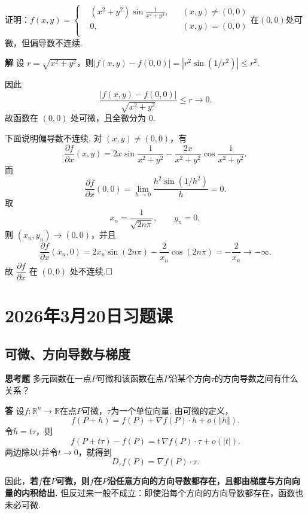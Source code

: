 \documentclass{ctexart}
\newcounter{EnvironmentCounter}
\newcommand{\renewEnvironmentCounter}{\setcounter{EnvironmentCounter}{0}}
\newenvironment{custom}[1]{\par\noindent \textbf{#1}\quad}{\par\vspace{1em}}
\begin{document}
\begin{example}
证明：$f(x,y)=\left\{\begin{aligned}&(x^{2}+y^{2})\sin{\frac{1}{x^{2}+y^{2}}},&& (x,y)\neq (0,0)\\&0, &&(x,y)=(0,0)\\\end{aligned}\right.$在$(0,0)$处可微，但偏导数不连续.
\end{example}

\begin{custom}{解}
设 $r=\sqrt{x^2+y^2}$，则$|f(x,y)-f(0,0)|=|r^2\sin(1/r^2)|\leqslant r^2.$

因此
$$\frac{|f(x,y)-f(0,0)|}{\sqrt{x^2+y^2}}
\leqslant r\to 0.$$
故函数在 $(0,0)$ 处可微，且全微分为 $0$.

下面说明偏导数不连续. 对 $(x,y)\neq (0,0)$，有
$$\frac{\partial f}{\partial x}(x,y)
=2x\sin\frac1{x^2+y^2}
-\frac{2x}{x^2+y^2}\cos\frac1{x^2+y^2}.$$
而
$$\frac{\partial f}{\partial x}(0,0)
=\lim\limits_{h\to 0}\frac{h^2\sin(1/h^2)}{h}=0.$$
取
$$x_n=\frac1{\sqrt{2n\pi}},\qquad y_n=0,$$
则 $(x_n,y_n)\to(0,0)$，并且
$$\frac{\partial f}{\partial x}(x_n,0)
=2x_n\sin(2n\pi)-\frac{2}{x_n}\cos(2n\pi)
=-\frac{2}{x_n}\to -\infty.$$
故 $\dfrac{\partial f}{\partial x}$ 在 $(0,0)$ 处不连续.$\hfill{\square}$
\end{custom}

\clearpage
\renewEnvironmentCounter
\section{2026年3月20日习题课}
\subsection{可微、方向导数与梯度}
\begin{custom}{思考题}
多元函数在一点$P$可微和该函数在点$P$沿某个方向$\tau$的方向导数之间有什么关系？
\end{custom}

\begin{custom}{答}
设$f:\mathbb{R}^n\to\mathbb{R}$在点$P$可微，$\tau$为一个单位向量. 由可微的定义，
\[
f(P+h)=f(P)+\nabla f(P)\cdot h+o(\Vert h\Vert ).
\]
令$h=t\tau$，则
\[
f(P+t\tau)-f(P)=t\,\nabla f(P)\cdot \tau+o(|t|).
\]
两边除以$t$并令$t\to 0$，就得到
\[
D_\tau f(P)=\nabla f(P)\cdot \tau.
\]

因此，{\bf 若$f$在$P$可微，则$f$在$P$沿任意方向的方向导数都存在，且都由梯度与方向向量的内积给出.} 但反过来一般不成立：即使沿每个方向的方向导数都存在，函数也未必可微.
\end{custom}
\end{document}
